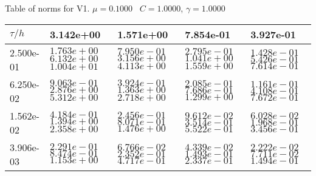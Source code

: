\begin{center}
Table of norms for V1. $\mu = 0.1000$ \, $C = 1.0000$, $\gamma = 1.0000$
  
\begin{tabular}{|p{1in}|p{1in}|p{1in}|p{1in}|p{1in}|} \hline
$\tau / h$ &3.142e+00 &1.571e+00 &7.854e-01 &3.927e-01 \\ \hline 
2.500e-01 & $1.763e+00$  $6.132e+00$  $1.004e+01$  & $7.950e-01$  $3.156e+00$  $4.113e+00$  & $2.795e-01$  $1.041e+00$  $1.559e+00$  & $1.428e-01$  $5.426e-01$  $7.614e-01$  \\ \hline 
6.250e-02 & $9.063e-01$  $2.876e+00$  $5.312e+00$  & $3.924e-01$  $1.363e+00$  $2.718e+00$  & $2.085e-01$  $7.686e-01$  $1.299e+00$  & $1.161e-01$  $4.108e-01$  $7.672e-01$  \\ \hline 
1.562e-02 & $4.184e-01$  $1.394e+00$  $2.358e+00$  & $2.456e-01$  $8.071e-01$  $1.476e+00$  & $9.612e-02$  $3.514e-01$  $5.522e-01$  & $6.028e-02$  $1.968e-01$  $3.456e-01$  \\ \hline 
3.906e-03 & $2.291e-01$  $8.474e-01$  $1.153e+00$  & $6.766e-02$  $2.352e-01$  $4.717e-01$  & $4.339e-02$  $1.493e-01$  $2.337e-01$  & $2.222e-02$  $7.711e-02$  $1.494e-01$  \\ \hline 

\end{tabular}\\[20pt]
\end{center}
